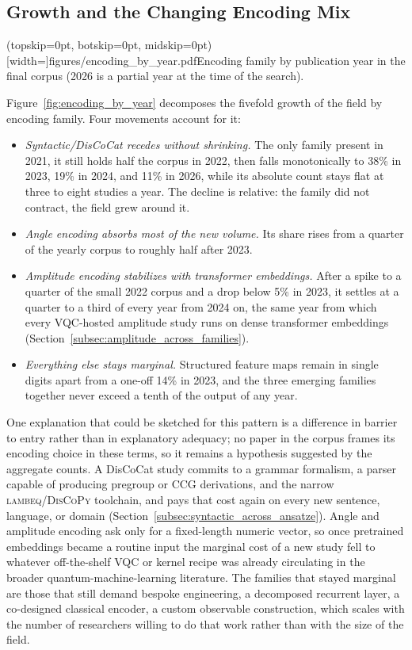 \documentclass{ieeeaccess}
\begin{document}
\subsection{Growth and the Changing Encoding Mix}
\label{subsec:temporal_encoding}

\Figure[t!](topskip=0pt, botskip=0pt, midskip=0pt)[width=\textwidth]{figures/encoding_by_year.pdf}{Encoding family by publication year in the final corpus (2026 is a partial year at the time of the search).\label{fig:encoding_by_year}}

Figure~\ref{fig:encoding_by_year} decomposes the fivefold growth of the field by encoding family. Four movements account for it:

\begin{itemize}
\item \emph{Syntactic/DisCoCat recedes without shrinking.} The only family present in 2021, it still holds half the corpus in 2022, then falls monotonically to 38\% in 2023, 19\% in 2024, and 11\% in 2026, while its absolute count stays flat at three to eight studies a year. The decline is relative: the family did not contract, the field grew around it.

\item \emph{Angle encoding absorbs most of the new volume.} Its share rises from a quarter of the yearly corpus to roughly half after 2023.

\item \emph{Amplitude encoding stabilizes with transformer embeddings.} After a spike to a quarter of the small 2022 corpus and a drop below 5\% in 2023, it settles at a quarter to a third of every year from 2024 on, the same year from which every VQC-hosted amplitude study runs on dense transformer embeddings (Section~\ref{subsec:amplitude_across_families}).

\item \emph{Everything else stays marginal.} Structured feature maps remain in single digits apart from a one-off 14\% in 2023, and the three emerging families together never exceed a tenth of the output of any year.
\end{itemize}

One explanation that could be sketched for this pattern is a difference in barrier to entry rather than in explanatory adequacy; no paper in the corpus frames its encoding choice in these terms, so it remains a hypothesis suggested by the aggregate counts. A DisCoCat study commits to a grammar formalism, a parser capable of producing pregroup or CCG derivations, and the narrow \textsc{lambeq}/\textsc{DisCoPy} toolchain, and pays that cost again on every new sentence, language, or domain (Section~\ref{subsec:syntactic_across_ansatze}). Angle and amplitude encoding ask only for a fixed-length numeric vector, so once pretrained embeddings became a routine input the marginal cost of a new study fell to whatever off-the-shelf VQC or kernel recipe was already circulating in the broader quantum-machine-learning literature. The families that stayed marginal are those that still demand bespoke engineering, a decomposed recurrent layer, a co-designed classical encoder, a custom observable construction, which scales with the number of researchers willing to do that work rather than with the size of the field.
\end{document}
